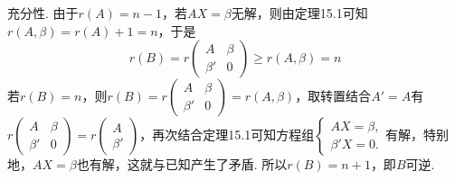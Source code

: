\begin{exercise}
\begin{exgroup}
\begin{answer}
\begin{enumerate}
                      充分性. 由于$r(A)=n-1$，若$AX=\beta$无解，则由定理15.1可知$r(A,\beta)=r(A)+1=n$，于是
                      \[ r(B)=r\begin{pmatrix}
                              A      & \beta \\
                              \beta' & 0
                          \end{pmatrix}\geqslant r(A,\beta)=n \]
                      若$r(B)=n$，则$r(B)=r\begin{pmatrix}
                              A      & \beta \\
                              \beta' & 0
                          \end{pmatrix}=r(A,\beta)$，取转置结合$A'=A$有$r\begin{pmatrix}
                              A      & \beta \\
                              \beta' & 0
                          \end{pmatrix}=r\begin{pmatrix}
                              A \\
                              \beta'
                          \end{pmatrix}$，再次结合定理15.1可知方程组$\begin{cases}
                              AX=\beta, \\
                              \beta' X=0.
                          \end{cases}$有解，特别地，$AX=\beta$也有解，这就与已知产生了矛盾. 所以$r(B)=n+1$，即$B$可逆.
            \end{enumerate}
        \end{answer}


\end{exgroup}
\end{exercise}

